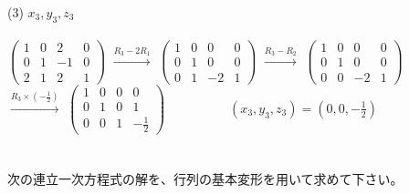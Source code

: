\documentclass[fleqn]{jsarticle}
\begin{document}
\begin{description}
\begin{spacing}{1.2}
            \item[(3)]
                $ x_3, y_3, z_3 $ \\\\
                $ \left(
                    \begin{array}{ccc|c}
                        1 & 0 & 2 & 0 \\
                        0 & 1 & -1 & 0 \\
                        2 & 1 & 2 & 1
                    \end{array}
                \right) $
                $ \xrightarrow{R_3-2R_1} $
                $ \left(
                    \begin{array}{ccc|c}
                        1 & 0 & 0 & 0 \\
                        0 & 1 & 0 & 0 \\
                        0 & 1 & -2 & 1
                    \end{array}
                \right) $
                $ \xrightarrow{R_3-R_2} $
                $ \left(
                    \begin{array}{ccc|c}
                        1 & 0 & 0 & 0 \\
                        0 & 1 & 0 & 0 \\
                        0 & 0 & -2 & 1
                    \end{array}
                \right) $\\
                $ \xrightarrow{R_3\times(-\frac{1}{2})} $
                $ \left(
                    \begin{array}{ccc|c}
                        1 & 0 & 0 & 0 \\
                        0 & 1 & 0 & 1 \\
                        0 & 0 & 1 & -\frac{1}{2}
                    \end{array}
                \right)
                \hspace{60pt}
                (x_3, y_3, z_3) = (0, 0, -\frac{1}{2}) $

        \end{spacing}
    \end{description}

    \section{}
    次の連立一次方程式の解を、行列の基本変形を用いて求めて下さい。\\
\end{document}
